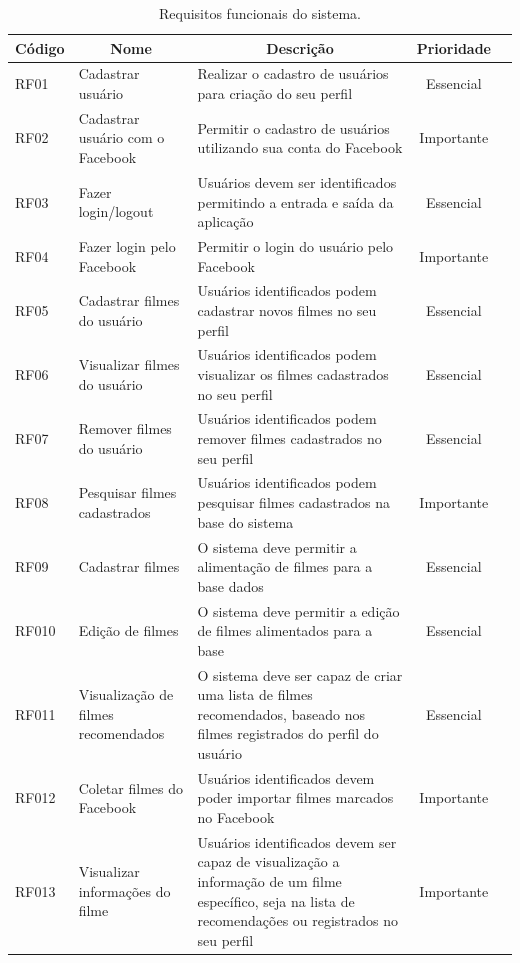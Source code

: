 \begin{table}[H]
	\label{tab:req-funcionais}
	\centering
	\caption{Requisitos funcionais do sistema.}
	\def\arraystretch{1.2} %
	\begin{tabular}{|m{1.2cm} | m{3cm} | m{7.2cm}| c | m{1.9cm}}
		\hline
		
		\multicolumn{1}{|c|}{\bfseries Código} & \multicolumn{1}{c|}{\bfseries Nome} & \multicolumn{1}{c|}{\bfseries Descrição} & \multicolumn{1}{c|}{\bfseries Prioridade} \\ \hline
		RF01	& Cadastrar usuário	& Realizar o cadastro de usuários para criação do seu perfil	& Essencial \\ \hline
		RF02	& Cadastrar usuário com o Facebook	& Permitir o cadastro de usuários utilizando sua conta do Facebook	& Importante \\ \hline
		RF03	& Fazer login/logout	& Usuários devem ser identificados permitindo a entrada e saída da aplicação	& Essencial \\ \hline
		RF04	& Fazer login pelo Facebook	& Permitir o login do usuário pelo Facebook	& Importante \\ \hline
		RF05	& Cadastrar filmes do usuário	& Usuários identificados podem cadastrar novos filmes no seu perfil	& Essencial \\ \hline
		RF06	& Visualizar filmes do usuário	& Usuários identificados podem visualizar os filmes cadastrados no seu perfil	& Essencial \\ \hline
		RF07	& Remover filmes do usuário	& Usuários identificados podem remover filmes cadastrados no seu perfil	& Essencial \\ \hline
		RF08	& Pesquisar filmes cadastrados	& Usuários identificados podem pesquisar filmes cadastrados na base do sistema	& Importante \\ \hline
		RF09	& Cadastrar filmes	& O sistema deve permitir a alimentação de filmes para a base dados	& Essencial \\ \hline
		RF010	& Edição de filmes	& O sistema deve permitir a edição de filmes alimentados para a base	& Essencial \\ \hline
		RF011	& Visualização de filmes recomendados	& O sistema deve ser capaz de criar uma lista de filmes recomendados, baseado nos filmes registrados do perfil do usuário	& Essencial \\ \hline
		RF012	& Coletar filmes do Facebook	& Usuários identificados devem poder importar filmes marcados no Facebook	& Importante \\ \hline
		RF013	& Visualizar informações do filme	& Usuários identificados devem ser capaz de visualização a informação de um filme específico, seja na lista de recomendações ou registrados no seu perfil	& Importante \\ \hline
	\end{tabular}
\end{table}


